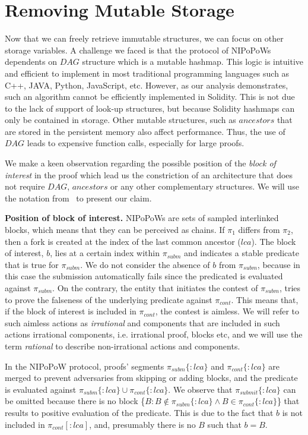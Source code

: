 \section{Removing Mutable Storage}

Now that we can freely retrieve immutable structures, we can focus on other
storage variables. A challenge we faced is that the protocol of NIPoPoWs
dependents on $DAG$ structure which is a mutable hashmap. This logic is
intuitive and efficient to implement in most traditional programming languages
such as C++, JAVA, Python, JavaScript, etc. However, as our analysis
demonstrates, such an algorithm cannot be efficiently implemented in Solidity.
This is not due to the lack of support of look-up structures, but because
Solidity hashmaps can only be contained in storage. Other
mutable structures, such as $ancestors$ that are stored in the persistent
memory also affect performance. Thus, the use of $DAG$
leads to expensive function calls, especially for large proofs.

We make a keen observation regarding the possible position of the \emph{block
of interest} in the proof which lead us the constriction of an architecture
that does not require $DAG$, $ancestors$ or any other complementary structures.
We will use the notation from~\cite{nipopows} to present our claim.

\noindent \textbf{Position of block of interest.} NIPoPoWs are sets of sampled
interlinked blocks, which means that they can be perceived as chains. If
$\pi_1$ differs from $\pi_2$, then a fork is created at the index of the last
common ancestor ($lca$). The block of interest, $b$, lies at a certain index
within $\pi_{subm}$ and indicates a stable predicate~\cite{nipopows,
generic-client} that is true for $\pi_{subm}$.  We do not consider the absence
of $b$ from $\pi_{subm}$, because in this case the submission automatically
fails since the predicated is evaluated against $\pi_{subm}$. On the contrary,
the entity that initiates the contest of $\pi_{subm}$, tries to prove the
falseness of the underlying predicate against $\pi_{cont}$. This means that, if
the block of interest is included in $\pi_{cont}$, the contest is aimless. We
will refer to such aimless actions as \emph{irrational} and components that are
included in such actions irrational components, i.e. irrational proof, blocks
etc, and we will use the term \emph{rational} to describe non-irrational
actions and components.

In the NIPoPoW protocol, proofs' segments $\pi_{subm}\{:lca\}$ and
$\pi_{cont}\{:lca\}$ are merged to prevent adversaries from skipping or adding
blocks, and the predicate is evaluated against $\pi_{subm}\{:lca\} \cup
\pi_{cont}\{:lca\}$. We observe that $\pi_{submit}\{:lca\}$ can be omitted
because there is no block \{$B : B \notin \pi_{subm}\{:lca\} \land B \in
\pi_{cont}\{:lca\}$\} that results to positive evaluation of the predicate.
This is due to the fact that $b$ is not included in $\pi_{cont}[:lca]$, and,
presumably there is no $B$ such that $b = B$.

